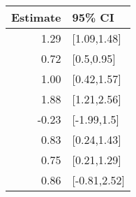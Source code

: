 \begin{tabular}{rl}
  \hline
Estimate & 95\% CI \\ 
  \hline
1.29 & [1.09,1.48] \\ 
  0.72 & [0.5,0.95] \\ 
  1.00 & [0.42,1.57] \\ 
  1.88 & [1.21,2.56] \\ 
  -0.23 & [-1.99,1.5] \\ 
  0.83 & [0.24,1.43] \\ 
  0.75 & [0.21,1.29] \\ 
  0.86 & [-0.81,2.52] \\ 
   \hline
\end{tabular}


